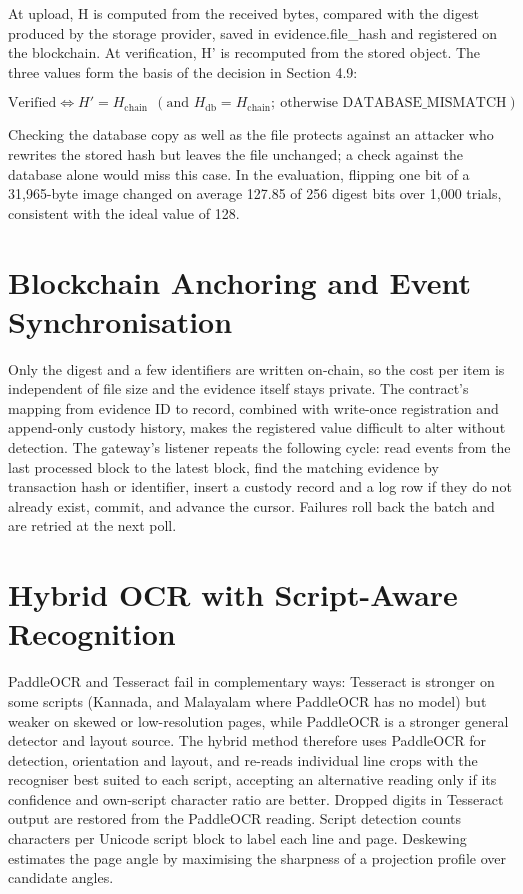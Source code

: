 \documentclass[12pt,a4paper,oneside]{report}
\newcommand{\code}[1]{{\small\ttfamily #1}}
\begin{document}
At upload, \code{H} is computed from the received bytes, compared with the digest produced by the storage provider, saved in \code{evidence.file\_\allowbreak{}hash} and registered on the blockchain. At verification, \code{H'} is recomputed from the stored object. The three values form the basis of the decision in Section 4.9:

\begin{equation*}
\text{Verified} \iff H' = H_{\mathrm{chain}}\ \ (\text{and } H_{\mathrm{db}} = H_{\mathrm{chain}};\ \text{otherwise DATABASE\_MISMATCH})
\end{equation*}

Checking the database copy as well as the file protects against an attacker who rewrites the stored hash but leaves the file unchanged; a check against the database alone would miss this case. In the evaluation, flipping one bit of a 31,965-byte image changed on average 127.85 of 256 digest bits over 1,000 trials, consistent with the ideal value of 128.

\section{Blockchain Anchoring and Event Synchronisation}
Only the digest and a few identifiers are written on-chain, so the cost per item is independent of file size and the evidence itself stays private. The contract's mapping from evidence ID to record, combined with write-once registration and append-only custody history, makes the registered value difficult to alter without detection. The gateway's listener repeats the following cycle: read events from the last processed block to the latest block, find the matching evidence by transaction hash or identifier, insert a custody record and a log row if they do not already exist, commit, and advance the cursor. Failures roll back the batch and are retried at the next poll.

\section{Hybrid OCR with Script-Aware Recognition}
PaddleOCR and Tesseract fail in complementary ways: Tesseract is stronger on some scripts (Kannada, and Malayalam where PaddleOCR has no model) but weaker on skewed or low-resolution pages, while PaddleOCR is a stronger general detector and layout source. The hybrid method therefore uses PaddleOCR for detection, orientation and layout, and re-reads individual line crops with the recogniser best suited to each script, accepting an alternative reading only if its confidence and own-script character ratio are better. Dropped digits in Tesseract output are restored from the PaddleOCR reading. Script detection counts characters per Unicode script block to label each line and page. Deskewing estimates the page angle by maximising the sharpness of a projection profile over candidate angles.
\end{document}
